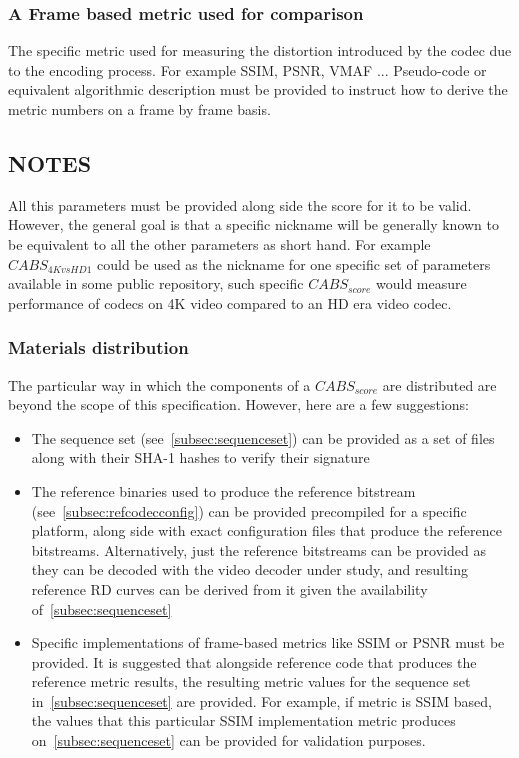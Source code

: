 \documentclass[12pt, conference, hidelinks, onecolumn]{IEEEtran}
\begin{document}
\subsubsection{A Frame based metric used for comparison}
\label{subsec:framebasemetric}
The specific metric used for measuring the distortion introduced by the codec due to the encoding process. For example SSIM,  PSNR, VMAF ... Pseudo-code or equivalent algorithmic description must be provided to instruct how to derive the metric numbers on a frame by frame basis.

\subsection{NOTES}
All this parameters must be provided along side the score for it to be valid. However, the general goal is that a specific nickname will be generally known to be equivalent to all the other parameters as short hand. For example $CABS_{4KvsHD1}$ could be used as the nickname for one specific set of parameters available in some public repository, such specific $CABS_{score}$ would measure performance of codecs on 4K video compared to an HD era video codec.

\subsubsection{Materials distribution}
The particular way in which the components of a $CABS_{score}$ are distributed are beyond the scope of this specification. However, here are a few suggestions:

\begin{itemize}
  \item The sequence set (see~\ref{subsec:sequenceset}) can be provided as a set of files along with their SHA-1 hashes\cite{shs} to verify their signature
  \item The reference binaries used to produce the reference bitstream (see~\ref{subsec:refcodecconfig}) can be provided precompiled for a specific platform, along side with exact configuration files that produce the reference bitstreams. Alternatively, just the reference bitstreams can be provided as they can be decoded with the video decoder under study, and resulting reference RD curves can be derived from it given the availability of~\ref{subsec:sequenceset}
  \item Specific implementations of frame-based metrics like SSIM or PSNR must be provided. It is suggested that alongside reference code that produces the reference metric results, the resulting metric values for the sequence set in~\ref{subsec:sequenceset} are provided. For example, if metric is SSIM based, the values that this particular SSIM implementation metric produces on~\ref{subsec:sequenceset} can be provided for validation purposes.
\end{itemize}
\end{document}
